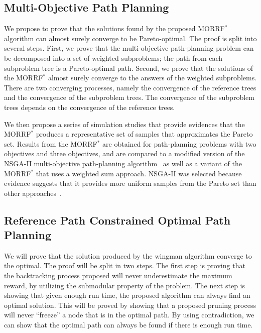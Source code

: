 \documentclass[phd]{byuprop}
\begin{document}
\subsection{Multi-Objective Path Planning}
\label{sec:validation:multi_objective_path_planning}

We propose to prove that the solutions found by the proposed MORRF$^{*}$ algorithm can almost surely converge to be Pareto-optimal.
The proof is split into several steps.
First, we prove that the multi-objective path-planning problem can be decomposed into a set of weighted subproblems;
the path from each subproblem tree is a Pareto-optimal path.
Second, we prove that the solutions of the MORRF$^{*}$ almost surely converge to the answers of the weighted subproblems.
There are two converging processes, namely the convergence of the reference trees and the convergence of the subproblem trees.
The convergence of the subproblem trees depends on the convergence of the reference trees.

We then propose a series of simulation studies that provide evidences that the MORRF$^{*}$ produces a representative set of samples that approximates the Pareto set.
Results from the MORRF$^{*}$ are obtained for path-planning problems with two objectives and three objectives, and are compared to a modified version of the NSGA-II multi-objective path-planning algorithm~\cite{Ahmed2013} as well as a variant of the MORRF$^{*}$ that uses a weighted sum approach.
NSGA-II was selected because evidence suggests that it provides more uniform samples from the Pareto set than other approaches~\cite{Deb2002}.

\subsection{Reference Path Constrained Optimal Path Planning}
\label{sec:validation:reference_path_constrained_optimal_path_planning}

We will prove that the solution produced by the wingman algorithm converge to the optimal.
The proof will be split in two steps.
The first step is proving that the backtracking process proposed will never underestimate the maximum reward, by utilizing the submodular property of the problem.
The next step is showing that given enough run time, the proposed algorithm can always find an optimal solution.
This will be proved by showing that a proposed pruning process will never ``freeze'' a node that is in the optimal path.
By using contradiction, we can show that the optimal path can always be found if there is enough run time.
\end{document}
